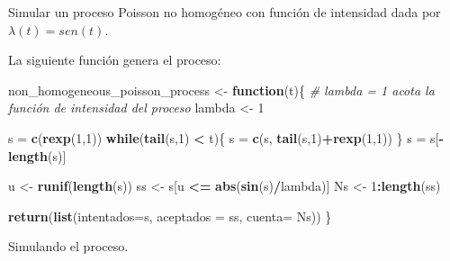 \documentclass[]{article}
\newenvironment{Shaded}{\begin{snugshade}}{\end{snugshade}}
\newcommand{\CommentTok}[1]{\textcolor[rgb]{0.56,0.35,0.01}{\textit{#1}}}
\newcommand{\ControlFlowTok}[1]{\textcolor[rgb]{0.13,0.29,0.53}{\textbf{#1}}}
\newcommand{\DataTypeTok}[1]{\textcolor[rgb]{0.13,0.29,0.53}{#1}}
\newcommand{\DecValTok}[1]{\textcolor[rgb]{0.00,0.00,0.81}{#1}}
\newcommand{\KeywordTok}[1]{\textcolor[rgb]{0.13,0.29,0.53}{\textbf{#1}}}
\newcommand{\NormalTok}[1]{#1}
\newcommand{\OperatorTok}[1]{\textcolor[rgb]{0.81,0.36,0.00}{\textbf{#1}}}
\newcommand{\StringTok}[1]{\textcolor[rgb]{0.31,0.60,0.02}{#1}}
\begin{document}
Simular un proceso Poisson no homogéneo con función de intensidad dada
por \(\lambda(t) = sen(t)\).

La siguiente función genera el proceso:

\begin{Shaded}
\begin{Highlighting}[]
\NormalTok{non_homogeneous_poisson_process <-}\StringTok{ }\ControlFlowTok{function}\NormalTok{(t)\{}
  \CommentTok{# lambda = 1 acota la función de intensidad del proceso}
\NormalTok{  lambda <-}\StringTok{ }\DecValTok{1}

\NormalTok{  s =}\StringTok{ }\KeywordTok{c}\NormalTok{(}\KeywordTok{rexp}\NormalTok{(}\DecValTok{1}\NormalTok{,}\DecValTok{1}\NormalTok{))}
  \ControlFlowTok{while}\NormalTok{(}\KeywordTok{tail}\NormalTok{(s,}\DecValTok{1}\NormalTok{) }\OperatorTok{<}\StringTok{ }\NormalTok{t)\{}
\NormalTok{    s =}\StringTok{ }\KeywordTok{c}\NormalTok{(s, }\KeywordTok{tail}\NormalTok{(s,}\DecValTok{1}\NormalTok{)}\OperatorTok{+}\KeywordTok{rexp}\NormalTok{(}\DecValTok{1}\NormalTok{,}\DecValTok{1}\NormalTok{))}
\NormalTok{  \}}
\NormalTok{  s =}\StringTok{ }\NormalTok{s[}\OperatorTok{-}\KeywordTok{length}\NormalTok{(s)]}
  
\NormalTok{  u <-}\StringTok{ }\KeywordTok{runif}\NormalTok{(}\KeywordTok{length}\NormalTok{(s))}
\NormalTok{  ss <-}\StringTok{ }\NormalTok{s[u }\OperatorTok{<=}\StringTok{ }\KeywordTok{abs}\NormalTok{(}\KeywordTok{sin}\NormalTok{(s)}\OperatorTok{/}\NormalTok{lambda)]}
\NormalTok{  Ns <-}\StringTok{ }\DecValTok{1}\OperatorTok{:}\KeywordTok{length}\NormalTok{(ss)}
  
  \KeywordTok{return}\NormalTok{(}\KeywordTok{list}\NormalTok{(}\DataTypeTok{intentados=}\NormalTok{s, }\DataTypeTok{aceptados =}\NormalTok{ ss, }\DataTypeTok{cuenta=}\NormalTok{ Ns))}
\NormalTok{\}}
\end{Highlighting}
\end{Shaded}

Simulando el proceso.
\end{document}
